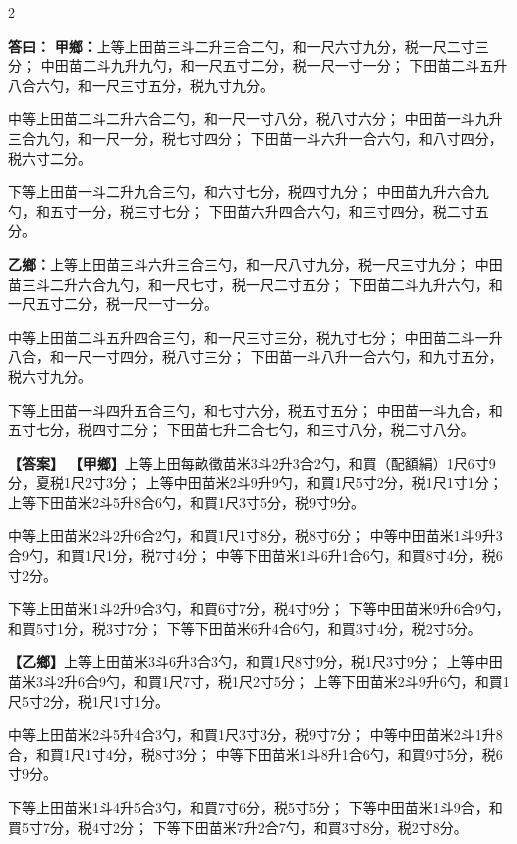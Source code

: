 \documentclass[11pt,a4paper]{article}
\newcommand{\ClassicalAnswer}[1]{\par\noindent\textbf{\color{answercolor}答曰：}#1\par}
\newcommand{\ModernAnswer}[1]{\par\noindent\textbf{\color{answercolor}【答案】}#1\par}
\begin{document}
\begin{paracol}{2}

\ClassicalAnswer{%
\textbf{甲鄉：}上等上田苗三斗二升三合二勺，和一尺六寸九分，税一尺二寸三分；
中田苗二斗九升九勺，和一尺五寸二分，税一尺一寸一分；
下田苗二斗五升八合六勺，和一尺三寸五分，税九寸九分。

中等上田苗二斗二升六合二勺，和一尺一寸八分，税八寸六分；
中田苗一斗九升三合九勺，和一尺一分，税七寸四分；
下田苗一斗六升一合六勺，和八寸四分，税六寸二分。

下等上田苗一斗二升九合三勺，和六寸七分，税四寸九分；
中田苗九升六合九勺，和五寸一分，税三寸七分；
下田苗六升四合六勺，和三寸四分，税二寸五分。

\textbf{乙鄉：}上等上田苗三斗六升三合三勺，和一尺八寸九分，税一尺三寸九分；
中田苗三斗二升六合九勺，和一尺七寸，税一尺二寸五分；
下田苗二斗九升六勺，和一尺五寸二分，税一尺一寸一分。

中等上田苗二斗五升四合三勺，和一尺三寸三分，税九寸七分；
中田苗二斗一升八合，和一尺一寸四分，税八寸三分；
下田苗一斗八升一合六勺，和九寸五分，税六寸九分。

下等上田苗一斗四升五合三勺，和七寸六分，税五寸五分；
中田苗一斗九合，和五寸七分，税四寸二分；
下田苗七升二合七勺，和三寸八分，税二寸八分。
}

\switchcolumn

\ModernAnswer{%
\textbf{【甲鄉】}上等上田每畝徵苗米3斗2升3合2勺，和買（配額絹）1尺6寸9分，夏税1尺2寸3分；
上等中田苗米2斗9升9勺，和買1尺5寸2分，税1尺1寸1分；
上等下田苗米2斗5升8合6勺，和買1尺3寸5分，税9寸9分。

中等上田苗米2斗2升6合2勺，和買1尺1寸8分，税8寸6分；
中等中田苗米1斗9升3合9勺，和買1尺1分，税7寸4分；
中等下田苗米1斗6升1合6勺，和買8寸4分，税6寸2分。

下等上田苗米1斗2升9合3勺，和買6寸7分，税4寸9分；
下等中田苗米9升6合9勺，和買5寸1分，税3寸7分；
下等下田苗米6升4合6勺，和買3寸4分，税2寸5分。

\textbf{【乙鄉】}上等上田苗米3斗6升3合3勺，和買1尺8寸9分，税1尺3寸9分；
上等中田苗米3斗2升6合9勺，和買1尺7寸，税1尺2寸5分；
上等下田苗米2斗9升6勺，和買1尺5寸2分，税1尺1寸1分。

中等上田苗米2斗5升4合3勺，和買1尺3寸3分，税9寸7分；
中等中田苗米2斗1升8合，和買1尺1寸4分，税8寸3分；
中等下田苗米1斗8升1合6勺，和買9寸5分，税6寸9分。

下等上田苗米1斗4升5合3勺，和買7寸6分，税5寸5分；
下等中田苗米1斗9合，和買5寸7分，税4寸2分；
下等下田苗米7升2合7勺，和買3寸8分，税2寸8分。
}

\end{paracol}
\end{document}
